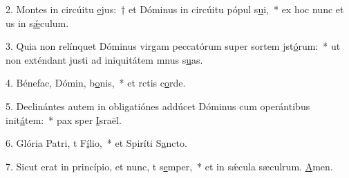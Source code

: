 2. Montes in circúitu \uline{e}jus:~† et Dóminus in circúitu pópul s\uline{u}i,~* ex hoc nunc et us in s\uline{ǽ}culum.\par 
3. Quia non relínquet Dóminus virgam peccatórum super sortem jst\uline{ó}rum:~* ut non exténdant justi ad iniquitátem mnus s\uline{u}as.\par 
4. Bénefac, Dómin, b\uline{o}nis,~* et rctis c\uline{o}rde.\par 
5. Declinántes autem in obligatiónes addúcet Dóminus cum operántibus init\uline{á}tem:~* pax sper \uline{I}sraël.\par 
6. Glória Patri, t F\uline{í}lio,~* et Spiríti S\uline{a}ncto.\par 
7. Sicut erat in princípio, et nunc, t s\uline{e}mper,~* et in sǽcula sæculrum. \uline{A}men.\par 
